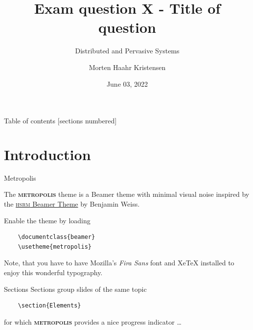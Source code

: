 \documentclass[10pt]{beamer}
\title[Title of question]{Exam question X - Title of question}
\subtitle{Distributed and Pervasive Systems}
\date{June 03, 2022}
\author[M.H. Kristensen]{Morten Haahr Kristensen}
\institute{Department of Electrical and Computer Engineering - Aarhus University}
\newcommand{\themename}{\textbf{\textsc{metropolis}}\xspace}
\begin{document}
\maketitle

\begin{frame}{Table of contents}
  [sections numbered]
  \tableofcontents[hideallsubsections]
\end{frame}

\section{Introduction}

\begin{frame}[fragile]{Metropolis}

  The \themename theme is a Beamer theme with minimal visual noise
  inspired by the \href{https://github.com/hsrmbeamertheme/hsrmbeamertheme}{\textsc{hsrm} Beamer
  Theme} by Benjamin Weiss.

  Enable the theme by loading

  \begin{verbatim}    \documentclass{beamer}
    \usetheme{metropolis}\end{verbatim}

  Note, that you have to have Mozilla's \emph{Fira Sans} font and XeTeX
  installed to enjoy this wonderful typography.
\end{frame}
\begin{frame}[fragile]{Sections}
  Sections group slides of the same topic

  \begin{verbatim}    \section{Elements}\end{verbatim}

  for which \themename provides a nice progress indicator \ldots
\end{frame}
\end{document}
